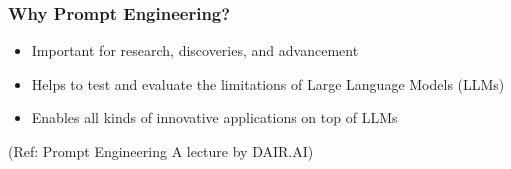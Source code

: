 \begin{frame}[fragile]\frametitle{Why Prompt Engineering?}

\begin{itemize}
\item Important for research, discoveries, and advancement
\item Helps to test and evaluate the limitations of Large Language Models (LLMs)
\item Enables all kinds of innovative  applications on top of LLMs
\end{itemize}	

{\tiny (Ref: Prompt Engineering A lecture by DAIR.AI)}
\end{frame}









